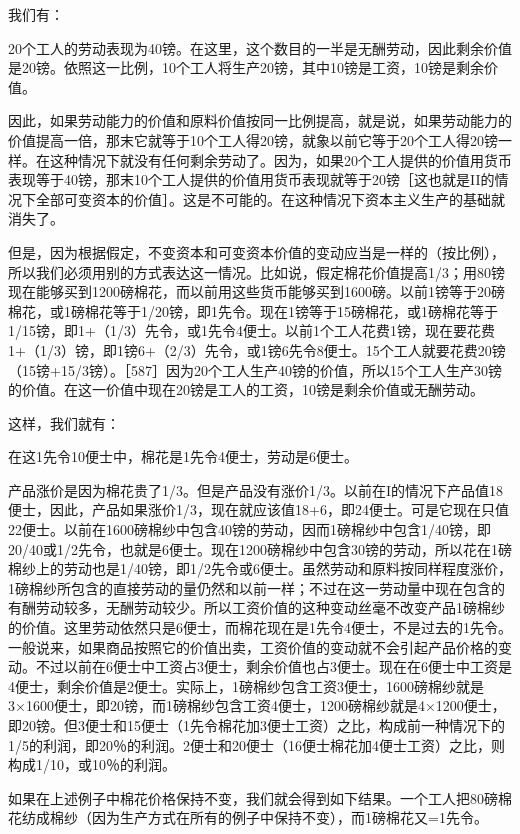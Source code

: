 我们有：

20个工人的劳动表现为40镑。在这里，这个数目的一半是无酬劳动，因此剩余价值是20镑。依照这一比例，10个工人将生产20镑，其中10镑是工资，10镑是剩余价值。

因此，如果劳动能力的价值和原料价值按同一比例提高，就是说，如果劳动能力的价值提高一倍，那末它就等于10个工人得20镑，就象以前它等于20个工人得20镑一样。在这种情况下就没有任何剩余劳动了。因为，如果20个工人提供的价值用货币表现等于40镑，那末10个工人提供的价值用货币表现就等于20镑［这也就是II的情况下全部可变资本的价值］。这是不可能的。在这种情况下资本主义生产的基础就消失了。

但是，因为根据假定，不变资本和可变资本价值的变动应当是一样的（按比例），所以我们必须用别的方式表达这一情况。比如说，假定棉花价值提高1/3；用80镑现在能够买到1200磅棉花，而以前用这些货币能够买到1600磅。以前1镑等于20磅棉花，或1磅棉花等于1/20镑，即1先令。现在1镑等于15磅棉花，或1磅棉花等于1/15镑，即1+（1/3）先令，或1先令4便士。以前1个工人花费1镑，现在要花费1+（1/3）镑，即1镑6+（2/3）先令，或1镑6先令8便士。15个工人就要花费20镑（15镑+15/3镑）。［587］因为20个工人生产40镑的价值，所以15个工人生产30镑的价值。在这一价值中现在20镑是工人的工资，10镑是剩余价值或无酬劳动。

这样，我们就有：

在这1先令10便士中，棉花是1先令4便士，劳动是6便士。

产品涨价是因为棉花贵了1/3。但是产品没有涨价1/3。以前在I的情况下产品值18便士，因此，产品如果涨价1/3，现在就应该值18+6，即24便士。可是它现在只值22便士。以前在1600磅棉纱中包含40镑的劳动，因而1磅棉纱中包含1/40镑，即20/40或1/2先令，也就是6便士。现在1200磅棉纱中包含30镑的劳动，所以花在1磅棉纱上的劳动也是1/40镑，即1/2先令或6便士。虽然劳动和原料按同样程度涨价，1磅棉纱所包含的直接劳动的量仍然和以前一样；不过在这一劳动量中现在包含的有酬劳动较多，无酬劳动较少。所以工资价值的这种变动丝毫不改变产品1磅棉纱的价值。这里劳动依然只是6便士，而棉花现在是1先令4便士，不是过去的1先令。一般说来，如果商品按照它的价值出卖，工资价值的变动就不会引起产品价格的变动。不过以前在6便士中工资占3便士，剩余价值也占3便士。现在在6便士中工资是4便士，剩余价值是2便士。实际上，1磅棉纱包含工资3便士，1600磅棉纱就是3×1600便士，即20镑，而1磅棉纱包含工资4便士，1200磅棉纱就是4×1200便士，即20镑。但3便士和15便士（1先令棉花加3便士工资）之比，构成前一种情况下的1/5的利润，即20％的利润。2便士和20便士（16便士棉花加4便士工资）之比，则构成1/10，或10％的利润。

如果在上述例子中棉花价格保持不变，我们就会得到如下结果。一个工人把80磅棉花纺成棉纱（因为生产方式在所有的例子中保持不变），而1磅棉花又=1先令。

